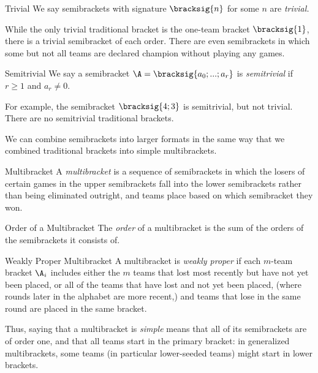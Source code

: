 {    \begin{definition}{Trivial}{}
        We say semibrackets with signature $\bracksig{n}$ for some $n$ are \textit{trivial.}
    \end{definition}

    While the only trivial traditional bracket is the one-team bracket $\bracksig{1}$, there is a trivial semibracket of each order. There are even semibrackets in which some but not all teams are declared champion without playing any games.

    \begin{definition}{Semitrivial}{}
        We say a semibracket $\A = \bracksig{a_0; ...; a_r}$ is \textit{semitrivial} if $r \geq 1$ and $a_r \neq 0.$
    \end{definition}

    For example, the semibracket $\bracksig{4;3}$ is semitrivial, but not trivial. There are no semitrivial traditional brackets.

    We can combine semibrackets into larger formats in the same way that we combined traditional brackets into simple multibrackets.

    \begin{definition}{Multibracket}{} 
        A \textit{multibracket} is a sequence of semibrackets in which the losers of certain games in the upper semibrackets fall into the lower semibrackets rather than being eliminated outright, and teams place based on which semibracket they won.
    \end{definition}

    \begin{definition}{Order of a Multibracket}{}
        The \textit{order} of a multibracket is the sum of the orders of the semibrackets it consists of.
    \end{definition}

    \begin{definition}{Weakly Proper Multibracket}{}
        A multibracket is \textit{weakly proper} if each $m$-team bracket $\A_i$ includes either the $m$ teams that lost most recently but have not yet been placed, or all of the teams that have lost and not yet been placed, (where rounds later in the alphabet are more recent,) and teams that lose in the same round are placed in the same bracket.
    \end{definition}

    Thus, saying that a multibracket is \textit{simple} means that all of its semibrackets are of order one, and that all teams start in the primary bracket: in generalized multibrackets, some teams (in particular lower-seeded teams) might start in lower brackets.
    
}
